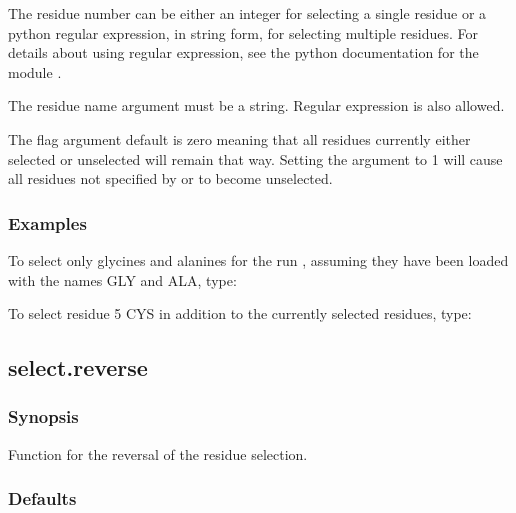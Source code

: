 The residue number can be either an integer for selecting a single residue or a python
regular expression, in string form, for selecting multiple residues.  For details about
using regular expression, see the python documentation for the module 
.

The residue name argument must be a string.  Regular expression is also allowed.

The 
 flag argument default is zero meaning that all residues currently either
selected or unselected will remain that way.  Setting the argument to 1 will cause all
residues not specified by 
 or 
 to become unselected.


\subsubsection{Examples}

To select only glycines and alanines for the run 
, assuming they have been loaded with
the names GLY and ALA, type:




To select residue 5 CYS in addition to the currently selected residues, type:








\newpage

\subsection{select.reverse}


\subsubsection{Synopsis}

Function for the reversal of the residue selection.

\subsubsection{Defaults}


